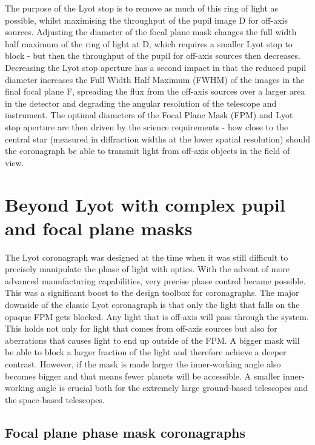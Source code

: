 \documentclass[letterpaper]{ar-1col}
\begin{document}
The purpose of the Lyot stop is to remove as much of this ring of light as possible, whilst maximising the throughput of the pupil image D for off-axis sources.
%
Adjusting the diameter of the focal plane mask changes the full width half maximum of the ring of light at D, which requires a smaller Lyot stop to block - but then the throughput of the pupil for off-axis sources then decreases.
%
Decreasing the Lyot stop aperture has a second impact in that the reduced pupil diameter increases the Full Width Half Maximum (FWHM) of the images in the final focal plane F, spreading the flux from the off-axis sources over a larger area in the detector and degrading the angular resolution of the telescope and instrument.
%
The optimal diameters of the Focal Plane Mask (FPM) and Lyot stop aperture are then driven by the science requirements - how close to the central star (measured in diffraction widths at the lower spatial resolution) should the coronagraph be able to transmit light from off-axis objects in the field of view.

\section{Beyond Lyot with complex pupil and focal plane masks}

The Lyot coronagraph was designed at the time when it was still difficult to precisely manipulate the phase of light with optics.
%
With the advent of more advanced manufacturing capabilities, very precise phase control became possible.
%
This was a significant boost to the design toolbox for coronagraphs.
%
The major downside of the classic Lyot coronagraph is that only the light that falls on the opaque FPM gets blocked.
%
Any light that is off-axis will pass through the system.
%
This holds not only for light that comes from off-axis sources but also for aberrations that causes light to end up outside of the FPM.
%
A bigger mask will be able to block a larger fraction of the light and therefore achieve a deeper contrast.
%
However, if the mask is made larger the inner-working angle also becomes bigger and that means fewer planets will be accessible.
%
A smaller inner-working angle is crucial both for the extremely large ground-based telescopes and the space-based telescopes. 

\subsection{Focal plane phase mask coronagraphs}
\end{document}
